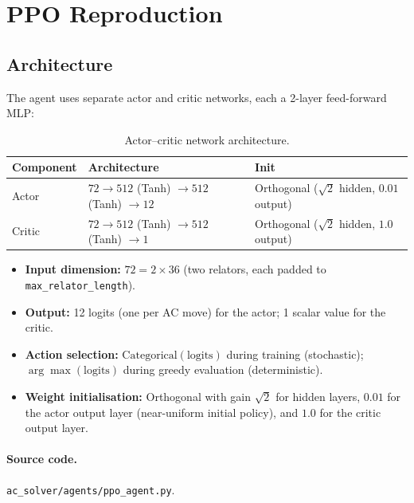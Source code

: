 \documentclass[11pt,a4paper]{article}
\begin{document}
\section{PPO Reproduction}\label{sec:ppo}

\subsection{Architecture}\label{sec:architecture}

The agent uses separate actor and critic networks, each a 2-layer
feed-forward MLP:

\begin{table}[h]
\centering
\caption{Actor--critic network architecture.}
\label{tab:architecture}
\begin{tabular}{lll}
  \toprule
  \textbf{Component} & \textbf{Architecture} & \textbf{Init} \\
  \midrule
  Actor  & $72 \to 512$ (Tanh) $\to 512$ (Tanh) $\to 12$  & Orthogonal ($\sqrt{2}$ hidden, $0.01$ output) \\
  Critic & $72 \to 512$ (Tanh) $\to 512$ (Tanh) $\to 1$   & Orthogonal ($\sqrt{2}$ hidden, $1.0$ output) \\
  \bottomrule
\end{tabular}
\end{table}

\begin{itemize}[nosep]
  \item \textbf{Input dimension:} $72 = 2 \times 36$ (two relators, each padded
    to \texttt{max\_relator\_length}).
  \item \textbf{Output:} 12 logits (one per AC move) for the actor; 1 scalar
    value for the critic.
  \item \textbf{Action selection:} $\mathrm{Categorical}(\text{logits})$ during
    training (stochastic); $\arg\max(\text{logits})$ during greedy evaluation
    (deterministic).
  \item \textbf{Weight initialisation:} Orthogonal with gain $\sqrt{2}$ for
    hidden layers, $0.01$ for the actor output layer (near-uniform initial
    policy), and $1.0$ for the critic output layer.
\end{itemize}

\paragraph{Source code.}
\texttt{ac\_solver/agents/ppo\_agent.py}.
\end{document}
